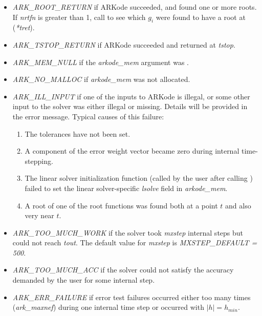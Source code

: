 \documentclass[letterpaper,10pt,english]{sphinxmanual}
\begin{document}
\begin{fulllineitems}
\begin{description}
\begin{itemize}
\item {} 
\emph{ARK\_ROOT\_RETURN} if ARKode succeeded, and found one or more roots.
If \emph{nrtfn} is greater than 1, call {\hyperref[c_interface/User_callable:ARKodeGetRootInfo]{}} to see
which $g_i$ were found to have a root at (\emph{*tret}).

\item {} 
\emph{ARK\_TSTOP\_RETURN} if ARKode succeeded and returned at \emph{tstop}.

\item {} 
\emph{ARK\_MEM\_NULL} if the \emph{arkode\_mem} argument was .

\item {} 
\emph{ARK\_NO\_MALLOC} if \emph{arkode\_mem} was not allocated.

\item {} 
\emph{ARK\_ILL\_INPUT} if one of the inputs to ARKode is illegal, or
some other input to the solver was either illegal or missing.
Details will be provided in the error message.  Typical causes
of this failure:
\begin{enumerate}
\item {} 
The tolerances have not been set.

\item {} 
A component of the error weight vector became zero during
internal time-stepping.

\item {} 
The linear solver initialization function (called by the
user after calling {\hyperref[c_interface/User_callable:ARKodeCreate]{}}) failed to set
the linear solver-specific \emph{lsolve} field in
\emph{arkode\_mem}.

\item {} 
A root of one of the root functions was found both at a
point $t$ and also very near $t$.

\end{enumerate}

\item {} 
\emph{ARK\_TOO\_MUCH\_WORK} if the solver took \emph{mxstep} internal steps
but could not reach \emph{tout}.  The default value for \emph{mxstep} is
\emph{MXSTEP\_DEFAULT = 500}.

\item {} 
\emph{ARK\_TOO\_MUCH\_ACC} if the solver could not satisfy the accuracy
demanded by the user for some internal step.

\item {} 
\emph{ARK\_ERR\_FAILURE} if error test failures occurred either too many
times (\emph{ark\_maxnef}) during one internal time step or occurred
with $|h| = h_{min}$.


\end{itemize}
\end{description}
\end{fulllineitems}
\end{document}
